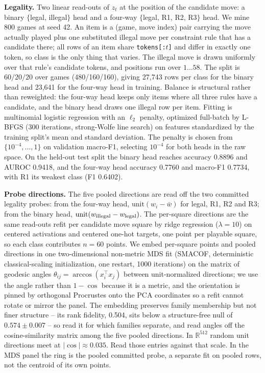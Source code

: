 \textbf{Legality.} Two linear read-outs of $z_t$ at the position of the candidate move: a binary
$\{$legal, illegal$\}$ head and a four-way $\{$legal, R1, R2, R3$\}$ head. We mine 800 games at
seed 42. An item is a (game, move index) pair carrying the move actually played plus one
substituted illegal move per constraint rule that has a candidate there; all rows of an item
share \texttt{tokens[:$t$]} and differ in exactly one token, so class is the only thing that
varies. The illegal move is drawn uniformly over that rule's candidate tokens, and positions run
over $1 \ldots 58$. The split is $60/20/20$ over games (480/160/160), giving 27,743 rows per
class for the binary head and 23,641 for the four-way head in training. Balance is structural
rather than reweighted: the four-way head keeps only items where all three rules have a
candidate, and the binary head draws one illegal row per item. Fitting is multinomial logistic
regression with an $\ell_2$ penalty, optimized full-batch by L-BFGS (300 iterations,
strong-Wolfe line search) on features standardized by the training split's mean and standard
deviation. The penalty is chosen from $\{10^{-4}, \ldots, 1\}$ on validation macro-F1, selecting
$10^{-4}$ for both heads in the raw space. On the held-out test split the binary head reaches accuracy 0.8896 and
AUROC 0.9418, and the four-way head accuracy 0.7760 and macro-F1 0.7734, with R1 its weakest
class (F1 0.6402).

\textbf{Probe directions.} The five pooled directions are read off the two committed legality
probes: from the four-way head, $\mathrm{unit}(w_i - \bar{w})$ for legal, R1, R2 and R3; from the
binary head, $\mathrm{unit}(w_{\rm illegal} - w_{\rm legal})$. The per-square directions are the
same read-outs refit per candidate move square by ridge regression ($\lambda = 10$) on centered
activations and centered one-hot targets, one point per playable square, so each class
contributes $n = 60$ points. We embed per-square points and pooled directions in one
two-dimensional non-metric MDS fit (SMACOF, deterministic classical-scaling initialization, one
restart, 1000 iterations) on the matrix of geodesic angles $\theta_{ij} = \arccos(x_i^\top x_j)$
between unit-normalized directions; we use the angle rather than $1 - \cos$ because it is a
metric, and the orientation is pinned by orthogonal Procrustes onto the PCA coordinates so a
refit cannot rotate or mirror the panel. The embedding preserves family membership but not finer
structure -- its rank fidelity, 0.504, sits below a structure-free null of $0.574 \pm 0.007$ --
so read it for which families separate, and read angles off the cosine-similarity matrix among
the five pooled directions. In $\mathbb{R}^{512}$ random unit directions meet at $|\cos| \approx
0.035$. Read those entries against that scale. In the MDS panel
the ring is the pooled committed probe, a separate fit on pooled rows, not the centroid of its
own points.

